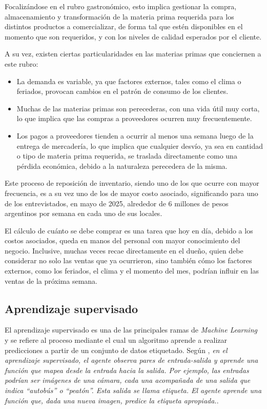 Focalizándose en el rubro gastronómico, esto implica gestionar la compra, almacenamiento y transformación de la materia prima requerida para los distintos productos a comercializar, de forma tal que estén disponibles en el momento que son requeridos, y con los niveles de calidad esperados por el cliente.

A su vez, existen ciertas particularidades en las materias primas que conciernen a este rubro:

\begin{itemize}
    \item La demanda es variable, ya que factores externos, tales como el clima o feriados, provocan cambios en el patrón de consumo de los clientes.
    \item Muchas de las materias primas son perecederas, con una vida útil muy corta, lo que implica que las compras a proveedores ocurren muy frecuentemente.
    \item Los pagos a proveedores tienden a ocurrir al menos una semana luego de la entrega de mercadería, lo que implica que cualquier desvío, ya sea en cantidad o tipo de materia prima requerida, se traslada directamente como una pérdida económica, debido a la naturaleza perecedera de la misma.
\end{itemize}

Este proceso de reposición de inventario, siendo uno de los que ocurre con mayor frecuencia, es a su vez uno de los de mayor costo asociado, significando para uno de los entrevistados, en mayo de 2025, alrededor de 6 millones de pesos argentinos por semana en cada uno de sus locales.

El cálculo de cuánto se debe comprar es una tarea que hoy en día, debido a los costos asociados, queda en manos del personal con mayor conocimiento del negocio. Inclusive, muchas veces recae directamente en el dueño, quien debe considerar no solo las ventas que ya ocurrieron, sino también cómo los factores externos, como los feriados, el clima y el momento del mes, podrían influir en las ventas de la próxima semana.

\subsection{Aprendizaje supervisado}

El aprendizaje supervisado es una de las principales ramas de \emph{Machine Learning} y se refiere al proceso mediante el cual un algoritmo aprende a realizar predicciones a partir de un conjunto de datos etiquetado. Según \parencite{russell2022ai}, \guillemotleft{}\emph{en el aprendizaje supervisado, el agente observa pares de entrada-salida y aprende una función que mapea desde la entrada hacia la salida. Por ejemplo, las entradas podrían ser imágenes de una cámara, cada una acompañada de una salida que indica \textquotedblleft autobús\textquotedblright{} o \textquotedblleft peatón\textquotedblright{}. Esta salida se llama etiqueta. El agente aprende una función que, dada una nueva imagen, predice la etiqueta apropiada.}\guillemotright{}.

